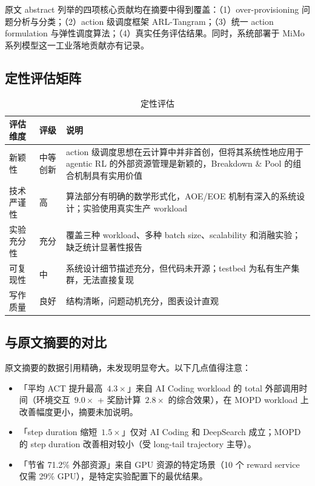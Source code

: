 \documentclass[11pt, a4paper]{article}
\begin{document}
\begin{keyinsight}[贡献完整性核查]
原文 abstract 列举的四项核心贡献均在摘要中得到覆盖：（1）over-provisioning 问题分析与分类；（2）action 级调度框架 ARL-Tangram；（3）统一 action formulation 与弹性调度算法；（4）真实任务评估结果。同时，系统部署于 MiMo 系列模型这一工业落地贡献亦有记录。
\end{keyinsight}

\subsection{定性评估矩阵}

\begin{table}[htbp]
\centering
\caption{定性评估}
\label{tab:qualeval}
\begin{tabular}{llp{}}
\toprule
\textbf{评估维度} & \textbf{评级} & \textbf{说明} \\
\midrule
新颖性 & 中等创新 & action 级调度思想在云计算中并非首创，但将其系统性地应用于 agentic RL 的外部资源管理是新颖的，Breakdown \& Pool 的组合机制具有实用价值 \\
技术严谨性 & 高 & 算法部分有明确的数学形式化，AOE/EOE 机制有深入的系统设计；实验使用真实生产 workload \\
实验充分性 & 充分 & 覆盖三种 workload、多种 batch size、scalability 和消融实验；缺乏统计显著性报告 \\
可复现性 & 中 & 系统设计细节描述充分，但代码未开源；testbed 为私有生产集群，无法直接复现 \\
写作质量 & 良好 & 结构清晰，问题动机充分，图表设计直观 \\
\bottomrule
\end{tabular}
\end{table}

\subsection{与原文摘要的对比}

原文摘要的数据引用精确，未发现明显夸大。以下几点值得注意：

\begin{itemize}
  \item 「平均 ACT 提升最高~$4.3\times$」来自 AI Coding workload 的 total 外部调用时间（环境交互~$9.0\times$ + 奖励计算~$2.8\times$ 的综合效果），在 MOPD workload 上改善幅度更小，摘要未加说明。
  \item 「step duration 缩短~$1.5\times$」仅对 AI Coding 和 DeepSearch 成立；MOPD 的 step duration 改善相对较小（受 long-tail trajectory 主导）。
  \item 「节省 71.2\% 外部资源」来自 GPU 资源的特定场景（10 个 reward service 仅需 29\% GPU），是特定实验配置下的最优结果。
\end{itemize}
\end{document}

